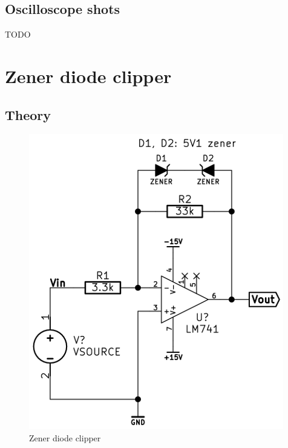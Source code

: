 \documentclass[11pt,a4paper]{article}
\begin{document}
\subsection{Oscilloscope shots}\label{lpf-oscilloscope-shots}
TODO


\section{Zener diode clipper}\label{zener-clipper}

\subsection{Theory}\label{clipper-theory}
\begin{figure}[htbp]
    \centering
        \includegraphics[scale=0.5]{img/zenerclipper.png}
    \caption{Zener diode clipper}
    \label{fig:clipper-schem}
\end{figure}
\end{document}
